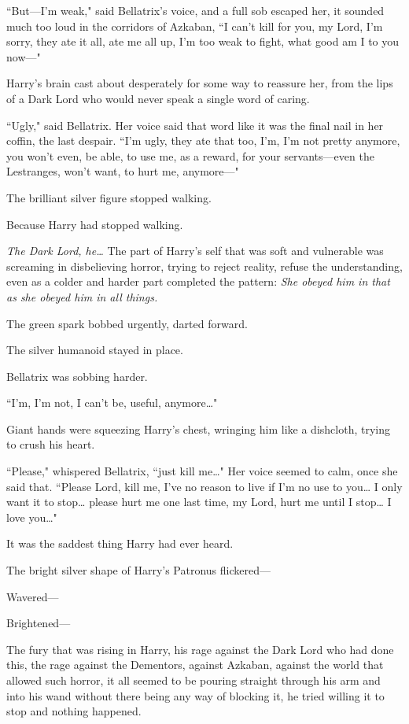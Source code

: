 ``But—I'm weak," said Bellatrix's voice, and a full sob escaped her, it sounded much too loud in the corridors of Azkaban, ``I can't kill for you, my Lord, I'm sorry, they ate it all, ate me all up, I'm too weak to fight, what good am I to you now—"

Harry's brain cast about desperately for some way to reassure her, from the lips of a Dark Lord who would never speak a single word of caring.

``Ugly," said Bellatrix. Her voice said that word like it was the final nail in her coffin, the last despair. ``I'm ugly, they ate that too, I'm, I'm not pretty anymore, you won't even, be able, to use me, as a reward, for your servants—even the Lestranges, won't want, to hurt me, anymore—"

The brilliant silver figure stopped walking.

Because Harry had stopped walking.

\emph{The Dark Lord, he{\ldots}} The part of Harry's self that was soft and vulnerable was screaming in disbelieving horror, trying to reject reality, refuse the understanding, even as a colder and harder part completed the pattern: \emph{She obeyed him in that as she obeyed him in all things.}

The green spark bobbed urgently, darted forward.

The silver humanoid stayed in place.

Bellatrix was sobbing harder.

``I'm, I'm not, I can't be, useful, anymore{\ldots}"

Giant hands were squeezing Harry's chest, wringing him like a dishcloth, trying to crush his heart.

``Please," whispered Bellatrix, ``just kill me{\ldots}" Her voice seemed to calm, once she said that. ``Please Lord, kill me, I've no reason to live if I'm no use to you{\ldots} I only want it to stop{\ldots} please hurt me one last time, my Lord, hurt me until I stop{\ldots} I love you{\ldots}"

It was the saddest thing Harry had ever heard.

The bright silver shape of Harry's Patronus flickered—

Wavered—

Brightened—

The fury that was rising in Harry, his rage against the Dark Lord who had done this, the rage against the Dementors, against Azkaban, against the world that allowed such horror, it all seemed to be pouring straight through his arm and into his wand without there being any way of blocking it, he tried willing it to stop and nothing happened.

